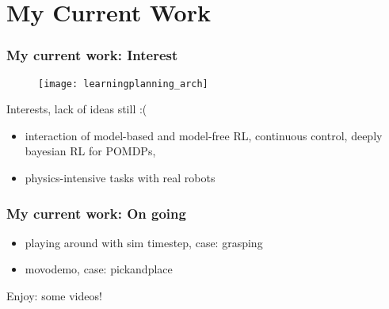 \section{My Current Work}

\begin{frame}
\frametitle{My current work: Interest}

\begin{figure}
    \centering
    \texttt{[image: learningplanning\_arch]}
\end{figure}

Interests, lack of ideas still :(
\begin{itemize}
  \item interaction of model-based and model-free RL, continuous control,
  deeply bayesian RL for POMDPs,
  \item physics-intensive tasks with real robots
\end{itemize}
\end{frame}

\begin{frame}
\frametitle{My current work: On going}
\begin{itemize}
  \item playing around with sim timestep, case: grasping
  \item movodemo, case: pickandplace
\end{itemize}
\vspace{5mm}

Enjoy: some videos!
\end{frame}


